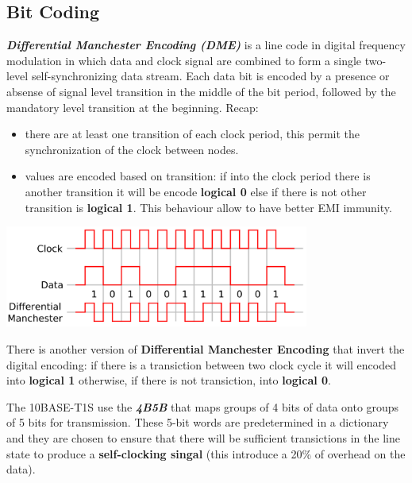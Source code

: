 \subsection{Bit Coding}
\begin{boxA}
    \textbf{\textit{Differential Manchester Encoding (DME)}} is a line code in digital frequency modulation in which data and clock signal are combined to form a single two-level self-synchronizing data stream. Each data bit is encoded by a presence or absense of signal level transition in the middle of the bit period, followed by the mandatory level transition at the beginning. Recap:
    \begin{itemize}[nosep]
        \item there are at least one transition of each clock period, this permit the synchronization of the clock between nodes.
        \item values are encoded based on transition: if into the clock period there is another transition it will be encode \textbf{logical 0} else if there is not other transition is \textbf{logical 1}. This behaviour allow to have better EMI immunity.
    \end{itemize}

    \begin{center}
        \includegraphics[width=0.75\textwidth]{img/dme}
    \end{center}

    There is another version of \textbf{Differential Manchester Encoding} that invert the digital encoding: if there is a transiction between two clock cycle it will encoded into \textbf{logical 1} otherwise, if there is not transiction, into \textbf{logical 0}.
\end{boxA}

\newpage

The 10BASE-T1S use the \textbf{\textit{4B5B}} that maps groups of 4 bits of data onto groups of 5 bits for transmission. These 5-bit words are predetermined in a dictionary and they are chosen to ensure that there will be sufficient transictions in the line state to produce a \textbf{self-clocking singal} (this introduce a 20\% of overhead on the data).

